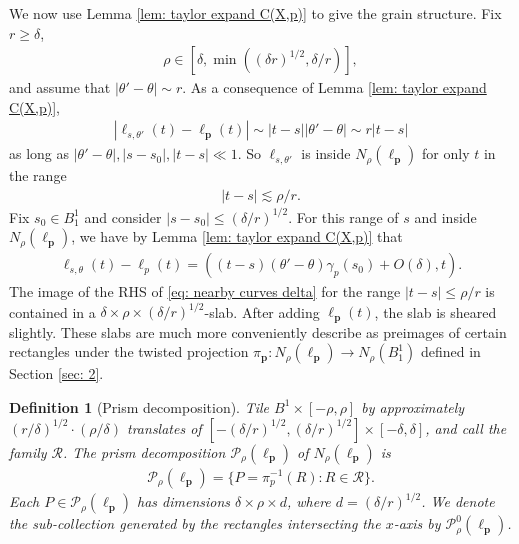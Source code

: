 \documentclass[12pt]{amsart}
\numberwithin{equation}{section}
\newtheorem{definition}[lemma]{Definition}
\newcommand{\1}{\mathbbm{1}}
\newcommand{\p}{\mathbf p}
\begin{document}
We now use Lemma \ref{lem: taylor expand C(X,p)} to give the grain structure. Fix $r \geq \delta$, 
\begin{align}
    \rho \in [\delta, \min((\delta r)^{1/2}, \delta / r)],
\end{align}
and assume that $|\theta' - \theta| \sim r$. As a consequence of Lemma \ref{lem: taylor expand C(X,p)}, 
\begin{align}
    |\ell_{s,\theta'}(t) - \ell_\p(t)| \sim |t-s| |\theta' - \theta| \sim r|t-s|
\end{align}
as long as $|\theta'-\theta|,|s-s_0|,|t-s| \ll 1$. 
So $\ell_{s,\theta'}$ is inside $N_\rho(\ell_\p)$ for only $t$ in the range 
\begin{align}
    |t - s| \lesssim \rho /r.
\end{align}
Fix $s_0 \in B_1^1$ and consider $|s - s_0| \leq (\delta / r)^{1/2}$. For this range of $s$ and inside $N_\rho(\ell_{\p})$, we have by Lemma \ref{lem: taylor expand C(X,p)} that 
\begin{align}\label{eq: nearby curves delta}
    \ell_{s, \theta}(t) - \ell_p(t) = ((t - s) (\theta' - \theta) \gamma_p(s_0) + O(\delta), t). 
\end{align}
The image of the RHS of \eqref{eq: nearby curves delta} for the range $|t -s| \leq \rho / r$ is contained in a $\delta \times \rho  \times (\delta /r)^{1/2}$-slab. After adding $\ell_\p(t)$, the slab is sheared slightly. These slabs are much more conveniently describe as preimages of certain rectangles under the twisted projection $\pi_\p : N_\rho(\ell_\p) \to N_\rho(B_1^1)$ defined in Section \ref{sec: 2}. 
\begin{definition}[Prism decomposition]\label{def: prism decomposition}
    Tile $B^1 \times [-\rho, \rho]$ by approximately $(r / \delta)^{1/2}\cdot (\rho / \delta)$ translates of $[-(\delta/ r)^{1/2},(\delta /r)^{1/2}]\times [-\delta, \delta]$, and call the family $\mathcal R$. The \emph{prism decomposition} $\mathcal P_\rho(\ell_\p)$ of $N_\rho(\ell_\p)$ is 
    \begin{align}
        \mathcal P_\rho(\ell_\p) = \{P = \pi_p^{-1}(R) : R \in \mathcal R\}. 
    \end{align}
    Each $P \in \mathcal P_\rho(\ell_\p)$ has dimensions $\delta \times \rho \times d$, where $d = (\delta/ r)^{1/2}$. We denote the sub-collection generated by the rectangles intersecting the $x$-axis by $\mathcal P_\rho^0(\ell_\p)$. 
\end{definition}
\end{document}
